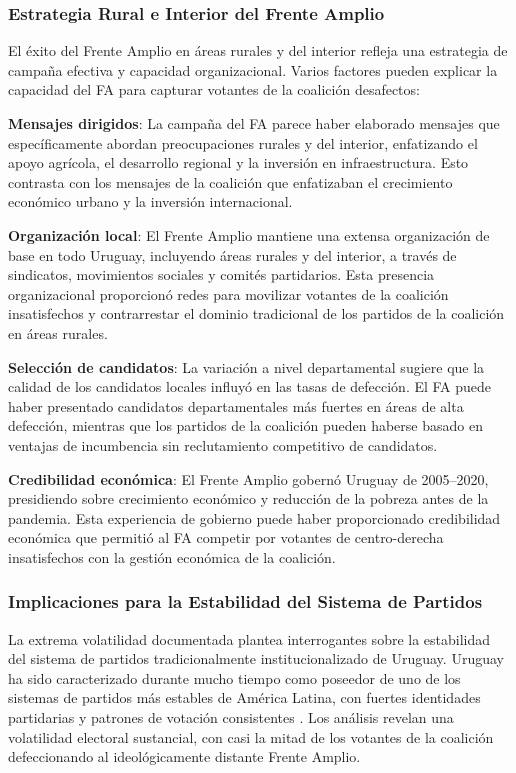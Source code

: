 \subsubsection{Estrategia Rural e Interior del Frente Amplio}

El éxito del Frente Amplio en áreas rurales y del interior refleja una estrategia de campaña efectiva y capacidad organizacional. Varios factores pueden explicar la capacidad del FA para capturar votantes de la coalición desafectos:

\textbf{Mensajes dirigidos}: La campaña del FA parece haber elaborado mensajes que específicamente abordan preocupaciones rurales y del interior, enfatizando el apoyo agrícola, el desarrollo regional y la inversión en infraestructura. Esto contrasta con los mensajes de la coalición que enfatizaban el crecimiento económico urbano y la inversión internacional.

\textbf{Organización local}: El Frente Amplio mantiene una extensa organización de base en todo Uruguay, incluyendo áreas rurales y del interior, a través de sindicatos, movimientos sociales y comités partidarios. Esta presencia organizacional proporcionó redes para movilizar votantes de la coalición insatisfechos y contrarrestar el dominio tradicional de los partidos de la coalición en áreas rurales.

\textbf{Selección de candidatos}: La variación a nivel departamental sugiere que la calidad de los candidatos locales influyó en las tasas de defección. El FA puede haber presentado candidatos departamentales más fuertes en áreas de alta defección, mientras que los partidos de la coalición pueden haberse basado en ventajas de incumbencia sin reclutamiento competitivo de candidatos.

\textbf{Credibilidad económica}: El Frente Amplio gobernó Uruguay de 2005--2020, presidiendo sobre crecimiento económico y reducción de la pobreza antes de la pandemia. Esta experiencia de gobierno puede haber proporcionado credibilidad económica que permitió al FA competir por votantes de centro-derecha insatisfechos con la gestión económica de la coalición.

\subsubsection{Implicaciones para la Estabilidad del Sistema de Partidos}

La extrema volatilidad documentada plantea interrogantes sobre la estabilidad del sistema de partidos tradicionalmente institucionalizado de Uruguay. Uruguay ha sido caracterizado durante mucho tiempo como poseedor de uno de los sistemas de partidos más estables de América Latina, con fuertes identidades partidarias y patrones de votación consistentes \citep{mainwaring1995party}. Los análisis revelan una volatilidad electoral sustancial, con casi la mitad de los votantes de la coalición defeccionando al ideológicamente distante Frente Amplio.

